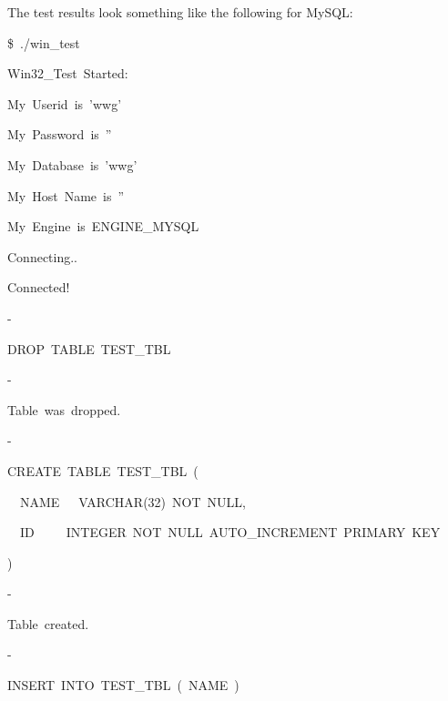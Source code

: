 \documentclass[english]{report}
\newenvironment{lyxcode}
   {\begin{list}{}{
     \setlength{\rightmargin}{\leftmargin}
     \setlength{\listparindent}{0pt}%
     \raggedright
     \setlength{\itemsep}{0pt}
     \setlength{\parsep}{0pt}
     \normalfont\ttfamily}%
    \item[]}
   {\end{list}}
\begin{document}
The test results look something like the following for MySQL:

\begin{lyxcode}
\$~./win\_test

{\footnotesize Win32\_Test~Started:}{\footnotesize \par}

{\footnotesize My~Userid~is~'wwg'}{\footnotesize \par}

{\footnotesize My~Password~is~''}{\footnotesize \par}

{\footnotesize My~Database~is~'wwg'}{\footnotesize \par}

{\footnotesize My~Host~Name~is~''}{\footnotesize \par}

{\footnotesize My~Engine~is~ENGINE\_MYSQL}{\footnotesize \par}

{\footnotesize Connecting..}{\footnotesize \par}

{\footnotesize Connected!}{\footnotesize \par}

-

{\footnotesize DROP~TABLE~TEST\_TBL}{\footnotesize \par}

-

{\footnotesize Table~was~dropped.}{\footnotesize \par}

-

{\footnotesize CREATE~TABLE~TEST\_TBL~(}{\footnotesize \par}

~{\footnotesize ~NAME~~~VARCHAR(32)~NOT~NULL,}{\footnotesize \par}

~{\footnotesize ~ID~~~~~INTEGER~NOT~NULL~AUTO\_INCREMENT~PRIMARY~KEY}{\footnotesize \par}

{\footnotesize )}{\footnotesize \par}

-

{\footnotesize Table~created.}{\footnotesize \par}

-

{\footnotesize INSERT~INTO~TEST\_TBL~(~NAME~)}{\footnotesize \par}


\end{lyxcode}
\end{document}
